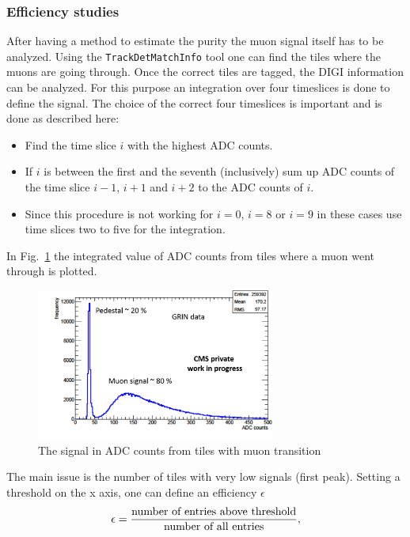 		\subsubsection{Efficiency studies}
			After having a method to estimate the purity the muon signal itself has to be analyzed.
			Using the \verb+TrackDetMatchInfo+ tool one can find the tiles where the muons are going through.
			Once the correct tiles are tagged, the DIGI information can be analyzed.
			For this purpose an integration over four timeslices is done to define the signal.
			The choice of the correct four timeslices is important and is done as described here:
			\begin{itemize}
			  \item Find the time slice $i$ with the highest ADC counts.
			  \item If $i$ is between the first and the seventh (inclusively) sum up ADC counts of the time slice $i-1$, $i+1$ and $i+2$ to the ADC counts of $i$.
			  \item Since this procedure is not working for $i=0$, $i=8$ or $i=9$ in these cases use time slices two to five for the integration.
			\end{itemize}
			In Fig.\ \ref{fig:efficiency1x1} the integrated value of ADC counts from tiles where a muon went through is plotted.
			\begin{figure}[htbp]
				\centering
				\includegraphics[width=0.70\textwidth]{Figures/erdogan/neighborhood1.png}
				\caption{The signal in ADC counts from tiles with muon transition}
				\label{fig:efficiency1x1}
			\end{figure}
			The main issue is the number of tiles with very low signals (first peak).
			Setting a threshold on the x axis, one can define an efficiency $\epsilon$
			\begin{equation}
				\epsilon = \frac{\textnormal{number of entries above threshold}}{\textnormal{number of all entries}},
			\end{equation}
